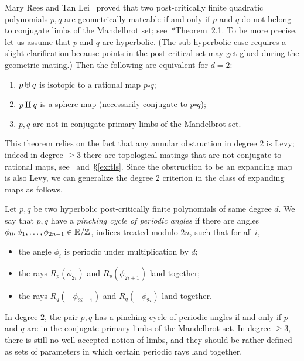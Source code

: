 \documentclass{amsart}
\begin{document}
Mary Rees and Tan Lei~\cite{tan:matings} proved that two
post-critically finite quadratic polynomials $p,q$ are geometrically
mateable if and only if $p$ and $q$ do not belong to conjugate limbs
of the Mandelbrot set;
see~\cite{buff+:questionsaboutmatings}*{Theorem~2.1}. To be more
precise, let us assume that $p$ and $q$ are hyperbolic. (The
sub-hyperbolic case requires a slight clarification because points in
the post-critical set may get glued during the geometric mating.) Then
the following are equivalent for $d=2$:
\begin{enumerate}
\item $p \uplus q$ is isotopic to a rational map $p \square q$;
\item $p \amalg q$ is a sphere map (necessarily conjugate to $p \square q$);
\item $p,q$ are not in conjugate primary limbs of the Mandelbrot
  set.
\end{enumerate}
This theorem relies on the fact that any annular obstruction in
degree $2$ is Levy; indeed in degree $\ge3$ there are topological
matings that are not conjugate to rational maps,
see~\cite{shishikura-t:matings} and~\S\ref{ex:tls}. Since the
obstruction to be an expanding map is also Levy, we can generalize the
degree $2$ criterion in the class of expanding maps as follows.

\begin{defn}
  Let $p,q$ be two hyperbolic post-critically finite polynomials of
  same degree $d$. We say that $p,q$ have a \emph{pinching cycle of
    periodic angles} if there are angles
  $\phi_0,\phi_1, \dots, \phi_{2n-1}\in {\mathbb R}/{\mathbb Z}$, indices treated modulo
  $2n$, such that for all $i$,
  \begin{itemize}
  \item the angle $\phi_i$ is periodic under multiplication by $d$;
  \item the rays $R_p(\phi_{2i})$ and $R_p(\phi_{2i+1})$ land
    together;
  \item the rays $R_q(-\phi_{2i-1})$ and $R_q(-\phi_{2i})$ land
    together.\qedhere
  \end{itemize}
\end{defn}
In degree $2$, the pair $p,q$ has a pinching cycle of periodic angles if
and only if $p$ and $q$ are in the conjugate primary limbs of the
Mandelbrot set.  In degree $\ge3$, there is still no well-accepted
notion of limbs, and they should be rather defined as sets of
parameters in which certain periodic rays land together.
\end{document}
